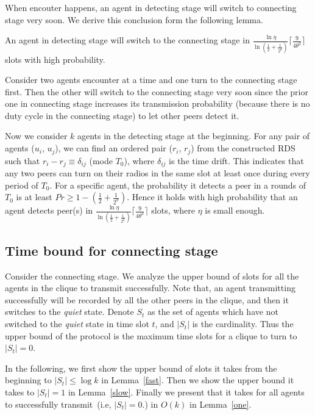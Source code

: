 When encouter happens, an agent in detecting stage will switch to connecting stage very soon. 
We derive this conclusion form the following lemma.
\begin{lemma}
    An agent in detecting stage  will switch to the connecting stage in 
    $\frac{\ln\eta}{\ln(\frac{1}{2}+\frac{1}{2^k})} \lceil \frac{9}{4\theta^{2}} \rceil$
    slots with high probability.

\end{lemma}
\begin{IEEEproof}
    Consider two agents encounter at a time and one turn to the connecting stage first.
    Then the other will switch to the connecting stage very soon since the prior one in connecting
    stage increases its transmission probability (because there is no duty cycle in the 
    connecting stage) to let other peers detect it. 

    Now we consider $k$ agents in the detecting stage at
    the beginning. 
    For any pair of agents ($u_i$, $u_j$),
    we can find an ordered pair ($r_i$, $r_j$) from the constructed RDS
    such that $r_i - r_j \equiv \delta_{ij}$ (mode $T_0$), where $\delta_{ij}$ is the time drift.
    This indicates that any two peers can turn on their radios in the same 
    slot at least once during every period of $T_0$. 
    For a specific agent, the probability it detects a peer in a rounds of $T_0$ is at least
    $Pr \geq 1 - (\frac{1}{2} +\frac{1}{2^k})$.
    Hence it holds with high probability that an agent detects peer(s) in 
    $\frac{\ln\eta}{\ln(\frac{1}{2}+\frac{1}{2^k})} \lceil \frac{9}{4\theta^{2}} \rceil$ slots,
    where $\eta$ is small enough.    
\end{IEEEproof}


\subsection{Time bound for connecting stage}
\label{boundPC}
Consider the connecting stage.
We analyze the upper bound of slots
for all the agents in the clique to transmit successfully.
Note that, an agent transmitting successfully will be recorded by 
all the other peers in the clique, and then it switches to the \emph{quiet} state. 
Denote $S_t$ as the set of agents
which have not switched to the \emph{quiet} state in time slot $t$, and 
$|S_t|$ is the cardinality. 
Thus the upper bound of the protocol is the maximum time slots
for a clique to turn to $|S_t| = 0$.

In the following, we first show the
upper bound of slots it takes from the beginning to $|S_t| \leq \log k$ in Lemma~\ref{fast}.
Then we show the upper bound it takes to $|S_t| = 1$ in Lemma~\ref{slow}.
Finally we present that it takes for all agents to successfully transmit~(i.e, $|S_t| = 0$.) in $O(k)$ in Lemma~\ref{one}. 

